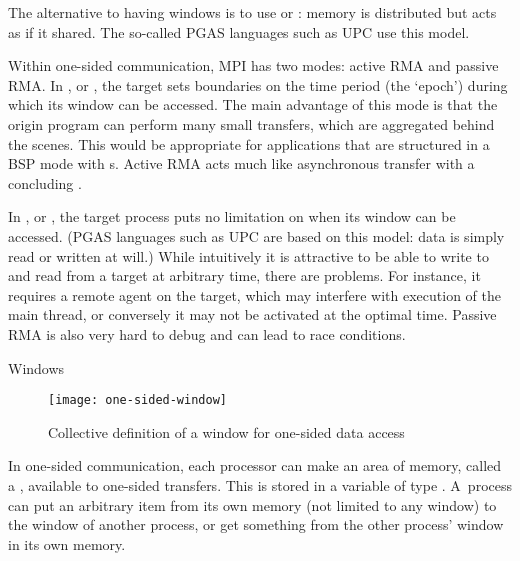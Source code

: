 The alternative to having windows is to use 
or : memory is distributed but acts as if
it shared. The so-called \acf{PGAS} languages such as \ac{UPC} use this model.

Within one-sided communication, MPI has two modes: active RMA and
passive RMA. In , or ,
the target sets boundaries on the time period (the `epoch')
during which its window can be accessed.
The main advantage
of this mode is that the origin program can perform many small transfers, which are
aggregated behind the scenes.
This would be appropriate for applications that are structured
in a \ac{BSP} mode with s.
Active RMA acts much like asynchronous transfer with a
concluding .

In , or ,
the target process puts no limitation on when its window can be accessed.
(\ac{PGAS} languages such as \ac{UPC} are based on this model: data is 
simply read or written at will.)
While 
intuitively it is attractive to be able to write to and read from a target at
arbitrary time,
there are problems. For instance, it requires a remote agent on the target,
which may interfere with execution of the main thread, or conversely it may not be
activated at the optimal time. Passive RMA is also very hard to debug and can lead
to race conditions.


 {Windows}
\label{sec:windows}

\begin{figure}[ht]
  \texttt{[image: one-sided-window]}
  \caption{Collective definition of a window for one-sided data access}
  \label{fig:window}
\end{figure}

In one-sided communication, each processor can make an area of memory,
called a , available to one-sided transfers.
%
This is stored in a variable of type .
%
A~process can put an arbitrary item from its own memory
(not limited to any window) to the window of another process,
or get something from the other process'
window in its own memory.

